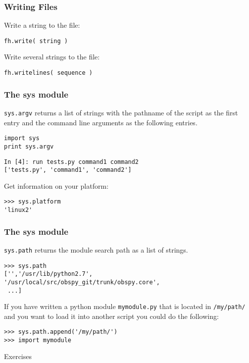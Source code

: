 \begin{frame}[fragile]
    \frametitle{Writing Files}
Write a string to the file:
    \begin{myColorBox}{0.9}{}
\begin{verbatim}
fh.write( string )
\end{verbatim}
    \end{myColorBox}
\pause
Write several strings to the file:
    \begin{myColorBox}{0.9}{}
\begin{verbatim}
fh.writelines( sequence )
\end{verbatim}
    \end{myColorBox}
\end{frame}

\begin{frame}[fragile]
\frametitle{The sys module}
\verb#sys.argv# returns a list of strings with the pathname of the script
as the first entry and the command line arguments as the following entries.
    \begin{myColorBox}{0.9}{}
    \begin{verbatim}
import sys
print sys.argv
    \end{verbatim}
    \end{myColorBox}
    \begin{myColorBox}{0.9}{}
    \begin{verbatim}
In [4]: run tests.py command1 command2
['tests.py', 'command1', 'command2']
    \end{verbatim}
    \end{myColorBox}
    \pause
Get information on your platform:
    \begin{myColorBox}{0.9}{}
    \begin{verbatim}
>>> sys.platform
'linux2'
    \end{verbatim}
    \end{myColorBox}
\end{frame}

\begin{frame}[fragile]
\frametitle{The sys module}
\verb#sys.path# returns the module search path as a list of strings. 
    \begin{myColorBox}{0.9}{}
    \begin{verbatim}
>>> sys.path
['','/usr/lib/python2.7', 
'/usr/local/src/obspy_git/trunk/obspy.core',
 ...]
    \end{verbatim}
    \end{myColorBox}
    \pause
If you have written a python module \verb#mymodule.py# that is located in
\verb#/my/path/# and you want to load it into another script you could do the
following:
    \begin{myColorBox}{0.9}{}
    \begin{verbatim}
>>> sys.path.append('/my/path/')
>>> import mymodule
    \end{verbatim}
    \end{myColorBox}
\end{frame}

\begin{frame}
\begin{center}
\Huge{Exercises}
\end{center}
\end{frame}
